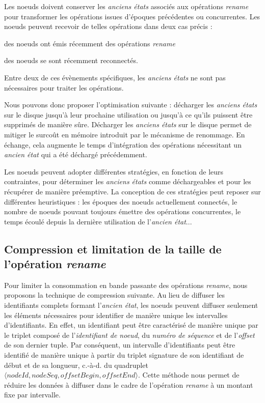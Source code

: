 \documentclass[12pt]{thesul}
\newcommand{\ie}{c.-à-d. }
\newcommand{\trm}[1]{\mathit{#1}}
\begin{document}
\label{sec:offloading-former-states}

Les noeuds doivent conserver les \emph{anciens états} associés aux opérations \emph{rename} pour transformer les opérations issues d'époques précédentes ou concurrentes.
Les noeuds peuvent recevoir de telles opérations dans deux cas précis :
\begin{enumerate*}[label=(\roman*)]
  \item des noeuds ont émis récemment des opérations \emph{rename}
  \item des noeuds se sont récemment reconnectés.
\end{enumerate*}
Entre deux de ces évènements spécifiques, les \emph{anciens états} ne sont pas nécessaires pour traiter les opérations.

Nous pouvons donc proposer l'optimisation suivante : décharger les \emph{anciens états} sur le disque jusqu'à leur prochaine utilisation ou jusqu'à ce qu'ils puissent être supprimés de manière sûre.
Décharger les \emph{anciens états} sur le disque permet de mitiger le surcoût en mémoire introduit par le mécanisme de renommage.
En échange, cela augmente le temps d'intégration des opérations nécessitant un \emph{ancien état} qui a été déchargé précédemment.

Les noeuds peuvent adopter différentes stratégies, en fonction de leurs contraintes, pour déterminer les \emph{anciens états} comme déchargeables et pour les récupérer de manière préemptive.
La conception de ces stratégies peut reposer sur différentes heuristiques : les époques des noeuds actuellement connectés, le nombre de noeuds pouvant toujours émettre des opérations concurrentes, le temps écoulé depuis la dernière utilisation de l'\emph{ancien état}...

\subsection{Compression et limitation de la taille de l'opération \emph{rename}}

\label{sec:compression-rename}

Pour limiter la consommation en bande passante des opérations \emph{rename}, nous proposons la technique de compression suivante.
Au lieu de diffuser les identifiants complets formant l'\emph{ancien état}, les noeuds peuvent diffuser seulement les éléments nécessaires pour identifier de manière unique les intervalles d'identifiants.
En effet, un identifiant peut être caractérisé de manière unique par le triplet composé de l'\emph{identifiant de noeud}, du \emph{numéro de séquence} et de l'\emph{offset} de son dernier tuple.
Par conséquent, un intervalle d'identifiants peut être identifié de manière unique à partir du triplet signature de son identifiant de début et de sa longueur, \ie du quadruplet $\langle\trm{nodeId}, \trm{nodeSeq}, \trm{offsetBegin}, \trm{offsetEnd}\rangle$.
Cette méthode nous permet de réduire les données à diffuser dans le cadre de l'opération \emph{rename} à un montant fixe par intervalle.
\end{document}
